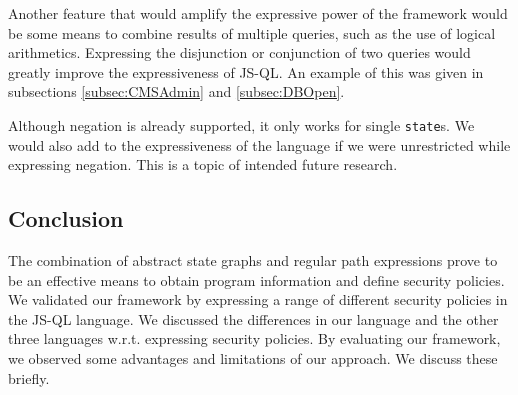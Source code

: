 Another feature that would amplify the expressive power of the framework would be some means to combine results of multiple queries, such as the use of logical arithmetics. Expressing the disjunction or conjunction of two queries would greatly improve the expressiveness of JS-QL. An example of this was given in subsections \ref{subsec:CMSAdmin} and \ref{subsec:DBOpen}. 


Although negation is already supported, it only works for single \texttt{state}s. We would also add to the expressiveness of the language if we were unrestricted while expressing negation. This is a topic of intended future research.


\subsection{Conclusion}

The combination of abstract state graphs and regular path expressions prove to be an effective means to obtain program information and define security policies. We validated our framework by expressing a range of different security policies in the JS-QL language. We discussed the differences in our language and the other three languages w.r.t. expressing security policies. By evaluating our framework, we observed some advantages and limitations of our approach. We discuss these briefly.
  


